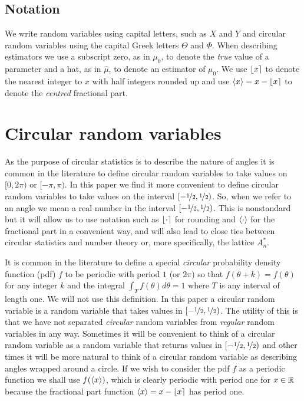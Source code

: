 \documentclass[journal]{../bib/IEEEtran}
\begin{document}
\subsection{Notation}
We write random variables using capital letters, such as $X$ and $Y$ and circular random variables using the capital Greek letters $\Theta$ and $\Phi$.  When describing estimators we use a subscript zero, as in $\mu_0$, to denote the \emph{true} value of a parameter and a hat, as in $\hat{\mu}$, to denote an estimator of $\mu_0$.  We use ${\left\lfloor x \right\rceil}$ to denote the nearest integer to $x$ with half integers rounded up and use $\left< x \right> = x - {\left\lfloor x \right\rceil}$ to denote the \emph{centred} fractional part.


\section{Circular random variables}\label{sec:circ-rand-vari}

As the purpose of circular statistics is to describe the nature of angles it is common in the literature to define circular random variables to take values on $[0, 2\pi)$ or $[-\pi, \pi)$. In this paper we find it more convenient to define circular random variables to take values on the interval $[-\nicefrac{1}{2}, \nicefrac{1}{2})$. So, when we refer to an angle we mean a real number in the interval $[-\nicefrac{1}{2}, \nicefrac{1}{2})$. This is nonstandard but it will allow us to use notation such as ${\left\lfloor \cdot \right\rceil}$ for rounding and $\left< \cdot \right>$ for the fractional part in a convenient way, and will also lead to close ties between circular statistics and number theory or, more specifically, the lattice $A_n^*$. 

It is common in the literature to define a special \emph{circular} probability density function (pdf) $f$ to be periodic with period $1$ (or $2\pi$) so that $f(\theta + k) = f(\theta)$ for any integer $k$ and the integral $\int_{T}f(\theta)d\theta = 1$ where $T$ is any interval of length one.  We will not use this definition.  In this paper a circular random variable is a random variable that takes values in $[-\nicefrac{1}{2},\nicefrac{1}{2})$. The utility of this is that we have not separated \emph{circular} random variables from \emph{regular} random variables in any way. Sometimes it will be convenient to think of a circular random variable as a random variable that returns values in $[-\nicefrac{1}{2},\nicefrac{1}{2})$ and other times it will be more natural to think of a circular random variable as describing angles wrapped around a circle.  %
If we wish to consider the pdf $f$ as a periodic function we shall use $f(\left< x \right>)$, which is clearly periodic with period one for $x \in {\mathbb R}$ because the fractional part function $\left< x \right> = x - {\left\lfloor x \right\rceil}$ has period one.
\end{document}
